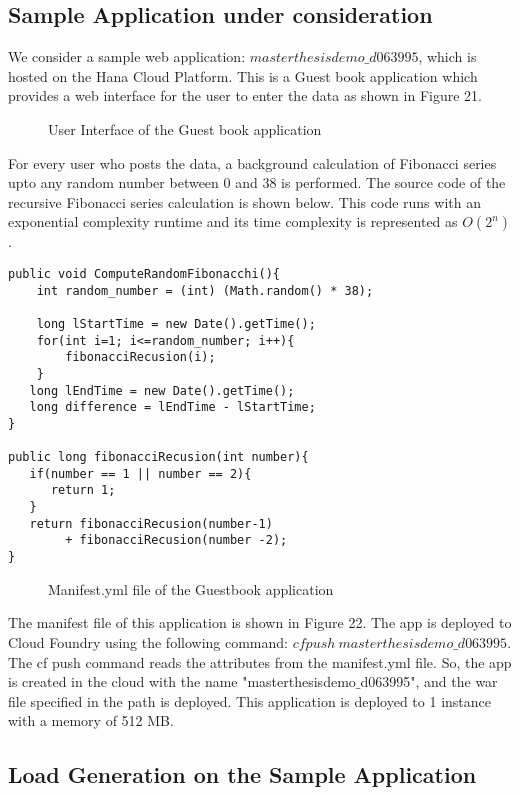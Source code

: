 \documentclass[article,type=msc,colorback,12pt,accentcolor=tud7b,table]{tudthesis}
\begin{document}
	\subsection{Sample Application under consideration}
We consider a sample web application: $masterthesisdemo\_d063995$, which is hosted on the Hana Cloud Platform. This is a Guest book application which provides a web interface for the user to enter the data as shown in Figure 21. 
 \begin{figure}[h]
 \begin{center}
  \makebox[\textwidth]{\texttt{[image: E1]}}
\end{center}
\caption{User Interface of the Guest book application}
\end{figure}
For every user who posts the data, a background calculation of Fibonacci series upto any random number between 0 and 38 is performed. The source code of the recursive Fibonacci series calculation is shown below. This code runs with an exponential complexity runtime and its time complexity is represented as $O(2^n)$.
 \begin{lstlisting}
public void ComputeRandomFibonacchi(){		
	int random_number = (int) (Math.random() * 38);		
		
	long lStartTime = new Date().getTime();
	for(int i=1; i<=random_number; i++){
		fibonacciRecusion(i);
    }			
   long lEndTime = new Date().getTime();
   long difference = lEndTime - lStartTime;    	
}
		  
public long fibonacciRecusion(int number){
   if(number == 1 || number == 2){
      return 1;
   }
   return fibonacciRecusion(number-1) 
   		+ fibonacciRecusion(number -2); 
}
\end{lstlisting}
 \begin{figure}[H]
 \begin{center}
  \makebox[\textwidth]{\texttt{[image: E2]}}
\end{center}
\caption{Manifest.yml file of the Guestbook application}
\end{figure}
The manifest file of this application is shown in Figure 22. The app is deployed to Cloud Foundry using the following command: $ cf push \: masterthesisdemo\_d063995 $. The cf push command reads the attributes from the manifest.yml file. So, the app is created in the cloud with the name "masterthesisdemo$\_$d063995", and the war file specified in the path is deployed. This application is deployed to 1 instance with a memory of 512 MB.	
	\subsection{Load Generation on the Sample Application}
	
\end{document}
